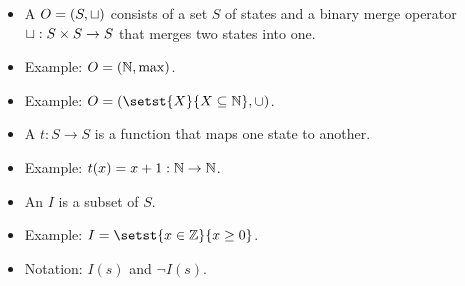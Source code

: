 \begin{frame}
  \Large
  \begin{itemize}
    \item
      A  $O = (S, \sqcup)$ consists of a set $S$ of
      states and a binary merge operator $\sqcup: S \times S \to S$ that merges
      two states into one.

    \pause\item
      Example: $O = (\mathbb{N}, \max)$.

    \pause\item
      Example: $O = (\setst{X}{X \subseteq \nats}, \cup)$.
  \end{itemize}
\end{frame}

\begin{frame}
  \Large
  \begin{itemize}
    \item
      A  $t: S \to S$ is a function that maps one state to
      another.

    \pause\item
      Example: $t(x) = x + 1 : \mathbb{N} \to \mathbb{N}$.
  \end{itemize}
\end{frame}

\begin{frame}
  \Large
  \begin{itemize}
    \item
      An  $I$ is a subset of $S$.

    \pause\item
      Example: $I = \setst{x \in \ints}{x \geq 0}$.

    \pause\item
      Notation: $I(s)$ and $\lnot I(s)$.
  \end{itemize}
\end{frame}

\newcommand{\internaltext}[1]{$\boldsymbol #1$}

